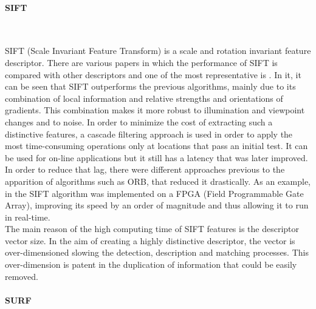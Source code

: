 \paragraph{SIFT}\mbox{}\\
\label{sift}

SIFT (Scale Invariant Feature Transform) is a scale and rotation invariant feature descriptor\cite{sift}. 
There are various papers in which the performance of SIFT is compared with other descriptors and one of the most representative is \cite{Mikolajczyk2005}. In it, it can be seen that SIFT 
outperforms the previous algorithms, mainly due to its combination of local information and relative strengths and orientations of gradients. This combination makes it more robust to illumination and viewpoint changes and to noise. 
In order to minimize the cost of extracting such a distinctive features, a cascade filtering approach is used in order to apply the most time-consuming operations only at locations that pass an initial test. 
It can be used for on-line applications but it still has a latency that was later improved. 
In order to reduce that lag, there were different approaches previous to the apparition of algorithms such as ORB, that reduced it drastically\cite{orb}. 
As an example, in \cite{sift_fpga} the SIFT algorithm was implemented on a FPGA (Field Programmable Gate Array), improving its speed by an order of magnitude and thus allowing it to run in real-time.
\\

The main reason of the high computing time of SIFT features is the descriptor vector size. 
In the aim of creating a highly distinctive descriptor, the vector is over-dimensioned slowing the detection, description and matching processes. 
This over-dimension is patent in the duplication of information that could be easily removed. 




\paragraph{SURF}\mbox{}\\

